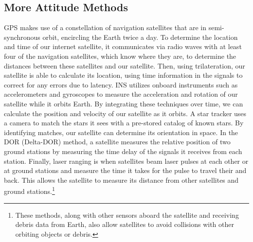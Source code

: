 \documentclass[10pt]{article}
\begin{document}
\subsection{More Attitude Methods}
\label{appen_attitude}

 GPS makes use of a constellation of navigation satellites that are in semi-synchronous orbit, encircling the Earth twice a day. To determine the location and time of our internet satellite, it communicates via radio waves with at least four of the navigation satellites, which know where they are, to determine the distances between these satellites and our satellite. Then, using trilateration, our satellite is able to calculate its location, using time information in the signals to correct for any errors due to latency. INS utilizes onboard instruments such as accelerometers and gyroscopes to measure the acceleration and rotation of our satellite while it orbits Earth. By integrating these techniques over time, we can calculate the position and velocity of our satellite as it orbits. A star tracker uses a camera to match the stars it sees with a pre-stored catalog of known stars. By identifying matches, our satellite can determine its orientation in space. In the DOR (Delta-DOR) method, a satellite measures the relative position of two ground stations by measuring the time delay of the signals it receives from each station. Finally, laser ranging is when satellites beam laser pulses at each other or at ground stations and measure the time it takes for the pulse to travel their and back. This allows the satellite to measure its distance from other satellites and ground stations.\footnote{These methods, along with other sensors aboard the satellite and receiving debris data from Earth, also allow satellites to avoid collisions with other orbiting objects or debris.}

\newpage
\raggedright


\end{document}
